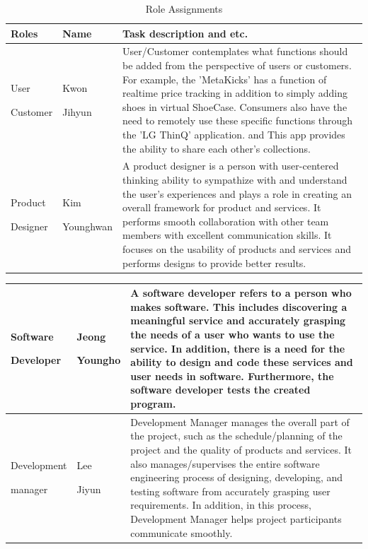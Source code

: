\documentclass[conference]{IEEEtran}
\begin{document}
\begin{table}[h]
\caption{Role Assignments}
\def\arraystretch{1.24} \small
    \begin{tabular}{|p{1.8cm}|p{1.4cm}|p{4.4cm}|}
        \hline
        Roles & Name & Task description and etc. \\ \hline
         User \par Customer & Kwon \par Jihyun & User/Customer contemplates what functions should be added from the perspective of users or customers. For example, the 'MetaKicks' has a function of realtime price tracking in addition to simply adding shoes in virtual ShoeCase. Consumers also have the need to remotely use these specific functions through the 'LG ThinQ'  application. and This app provides the ability to share each other's collections.\\ \hline
         
        Product \par Designer& Kim \par Younghwan  & A product designer is a person with user-centered thinking ability to sympathize with and understand the user's experiences and plays a role in creating an overall framework for product and services. It performs smooth collaboration with other team members with  excellent communication skills. It focuses on the usability of products and services and performs designs to provide better results.\\ \hline
	\end{tabular}
\end{table}

\begin{table}
\def\arraystretch{1.24} \small
    \begin{tabular}{|p{1.8cm}|p{1.4cm}|p{4.4cm}|}
        \hline
        Software \par Developer & Jeong \par Youngho  & A software developer refers to a person who makes software. This includes discovering a meaningful service and accurately grasping the needs of a user who wants to use the service. In addition, there is a need for the ability to design and code these services and user needs in software. Furthermore, the software developer tests the created program. \\ \hline
        
        Development \par manager & Lee \par Jiyun & Development Manager manages the overall part of the project, such as the schedule/planning of the project and the quality of products and services. It also manages/supervises the entire software engineering process of designing, developing, and testing software from accurately grasping user  requirements. In addition, in this process, Development Manager helps project participants communicate smoothly. \\ \hline
    \end{tabular}
\end{table}
\end{document}

